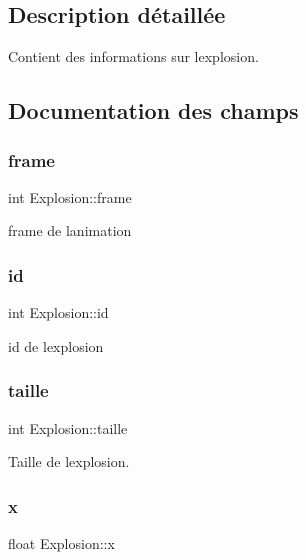 \subsection{Description détaillée}
Contient des informations sur l\textquotesingle{}explosion. 

\subsection{Documentation des champs}
\mbox{\label{struct_explosion_abf2153564f65733e9acde4d938cb0489}} 
\subsubsection{\texorpdfstring{frame}{frame}}
{\footnotesize\ttfamily int Explosion\+::frame}



frame de l\textquotesingle{}animation 

\mbox{\label{struct_explosion_a65d1b7dd9af207c3dc75cd106e2b0524}} 
\subsubsection{\texorpdfstring{id}{id}}
{\footnotesize\ttfamily int Explosion\+::id}



id de l\textquotesingle{}explosion 

\mbox{\label{struct_explosion_aa370d70c935c422014a3a5760e20b8a9}} 
\subsubsection{\texorpdfstring{taille}{taille}}
{\footnotesize\ttfamily int Explosion\+::taille}



Taille de l\textquotesingle{}explosion. 

\mbox{\label{struct_explosion_acae310a04fa43cd9aac6c54ca0c58ac2}} 
\subsubsection{\texorpdfstring{x}{x}}
{\footnotesize\ttfamily float Explosion\+::x}



